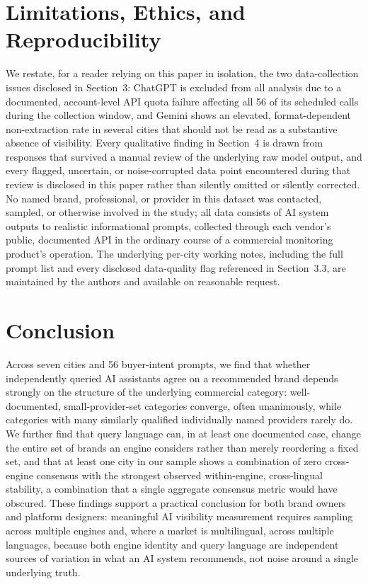 \documentclass[11pt]{article}
\begin{document}
\section{Limitations, Ethics, and Reproducibility}

We restate, for a reader relying on this paper in isolation, the two data-collection
issues disclosed in Section~3: ChatGPT is excluded from all analysis due to a
documented, account-level API quota failure affecting all 56 of its scheduled calls
during the collection window, and Gemini shows an elevated, format-dependent
non-extraction rate in several cities that should not be read as a substantive absence
of visibility. Every qualitative finding in Section~4 is drawn from responses that
survived a manual review of the underlying raw model output, and every flagged,
uncertain, or noise-corrupted data point encountered during that review is disclosed
in this paper rather than silently omitted or silently corrected. No named brand,
professional, or provider in this dataset was contacted, sampled, or otherwise involved
in the study; all data consists of AI system outputs to realistic informational
prompts, collected through each vendor's public, documented API in the ordinary course
of a commercial monitoring product's operation. The underlying per-city working notes,
including the full prompt list and every disclosed data-quality flag referenced in
Section~3.3, are maintained by the authors and available on reasonable request.

\section{Conclusion}

Across seven cities and 56 buyer-intent prompts, we find that whether independently
queried AI assistants agree on a recommended brand depends strongly on the structure of
the underlying commercial category: well-documented, small-provider-set categories
converge, often unanimously, while categories with many similarly qualified
individually named providers rarely do. We further find that query language can, in at
least one documented case, change the entire set of brands an engine considers rather
than merely reordering a fixed set, and that at least one city in our sample shows a
combination of zero cross-engine consensus with the strongest observed within-engine,
cross-lingual stability, a combination that a single aggregate consensus metric would
have obscured. These findings support a practical conclusion for both brand owners and
platform designers: meaningful AI visibility measurement requires sampling across
multiple engines and, where a market is multilingual, across multiple languages,
because both engine identity and query language are independent sources of variation
in what an AI system recommends, not noise around a single underlying truth.
\end{document}
